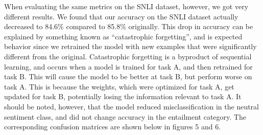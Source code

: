 \documentclass{article}
\begin{document}
When evaluating the same metrics on the SNLI dataset, however, we got very different results. We found that our accuracy on the SNLI dataset actually decreased to 
84.6\% compared to 85.8\% originally. This drop in accuracy can be explained by something known as “catastrophic forgetting”, and is expected behavior since we 
retrained the model with new examples that were significantly different from the original. Catastrophic forgetting is a byproduct of sequential learning, and occurs 
when a model is trained for task A, and then retrained for task B. This will cause the model to be better at task B, but perform worse on task A. This is because the 
weights, which were optimized for task A, get updated for task B, potentially losing the information relevant to task A. It should be noted, however, that the model 
reduced misclassification in the neutral sentiment class, and did not change accuracy in the entailment category. The corresponding confusion matrices are shown below 
in figures 5 and 6. 
\end{document}
